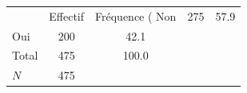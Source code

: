 {
\def\sym#1{\ifmmode^{#1}\else\(^{#1}\)\fi}
\begin{tabular}{l*{1}{cc}}
\toprule
            &    Effectif&Fréquence (%
\midrule
Non         &         275&        57.9\\
Oui         &         200&        42.1\\
Total       &         475&       100.0\\
\midrule
\(N\)       &         475&            \\
\bottomrule
\end{tabular}
}

